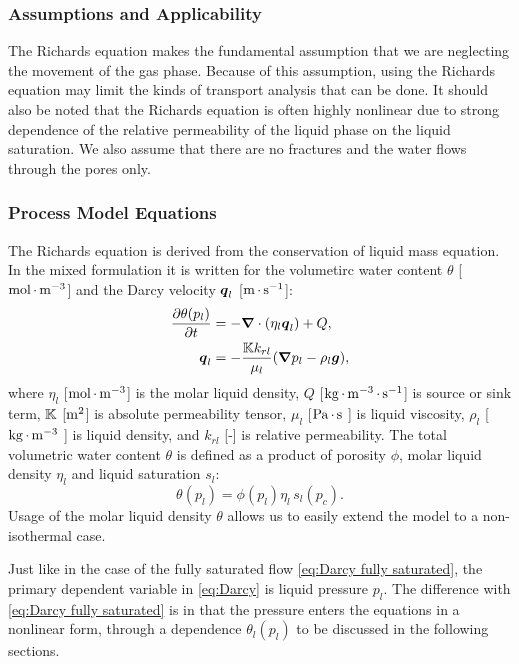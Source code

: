 \subsubsection{Assumptions and Applicability}

The Richards equation makes the fundamental assumption that 
we are neglecting the movement of the gas phase.
Because of this assumption, using the Richards equation may limit the kinds of 
transport analysis that can be done.
It should also be noted that the Richards equation is often highly nonlinear
due to strong dependence of the relative permeability of the liquid phase
on the liquid saturation.
We also assume that there are no fractures and the water flows through the pores only. 


\subsubsection{Process Model Equations} 
\label{sec:richards-model-equations}

The Richards equation is derived from the conservation of
liquid mass equation.
In the mixed formulation it is written
for the volumetirc water content $\theta$ [${\rm mol}{\,\cdot\,}{\rm m}^{-3}$] 
and the Darcy velocity ${\boldsymbol{q}}_l$ [${\rm m}{\,\cdot\,}{\rm s}^{-1}$]:  
\begin{subequations}\label{eq:Darcy}
\begin{align}
  \frac{\partial \theta(p_l)}{\partial t} 
  &= 
  -{\boldsymbol{\nabla}} \cdot (\eta_l {\boldsymbol{q}}_l) + Q,
  \\
  {\boldsymbol{q}}_l 
  &= 
  -\frac{{\mathbb K} k_{rl}}{\mu_l} ({\boldsymbol{\nabla}} p_l - \rho_l {\boldsymbol{g}}),
\end{align}
\end{subequations}
where 
$\eta_l$ [${\rm mol}{\,\cdot\,}{\rm m}^{-3}$] is the molar liquid density,
$Q$ [${\rm kg} {\,\cdot\,} {\rm m}^{-3} {\,\cdot\,} {\rm s}^{-1}$] is source or sink term,
${\mathbb K}$ [${\rm m}^2$] is absolute permeability tensor,
$\mu_l$ [${\rm Pa}{\,\cdot\,}{\rm s}$ ] is liquid viscosity,
$\rho_l$ [${\rm kg}{\,\cdot\,}{\rm m}^{-3}$ ] is liquid density, and
$k_{rl}$ [-] is relative permeability.
The total volumetric water content $\theta$ is defined as
a product of porosity $\phi$, molar liquid density $\eta_l$ and liquid saturation $s_l$:
$$
  \theta(p_l) = \phi(p_l) \eta_l\, s_l(p_c).
$$
Usage of the molar liquid density $\theta$
allows us to easily extend the model to a non-isothermal case.

Just like in the case of the fully saturated flow \eqref{eq:Darcy fully saturated},
the primary dependent variable in \eqref{eq:Darcy} is liquid pressure $p_l$.
The difference with \eqref{eq:Darcy fully saturated}
is in that the pressure enters the equations in a nonlinear form,
through a dependence $\theta_l(p_l)$ to be discussed in the following sections.

